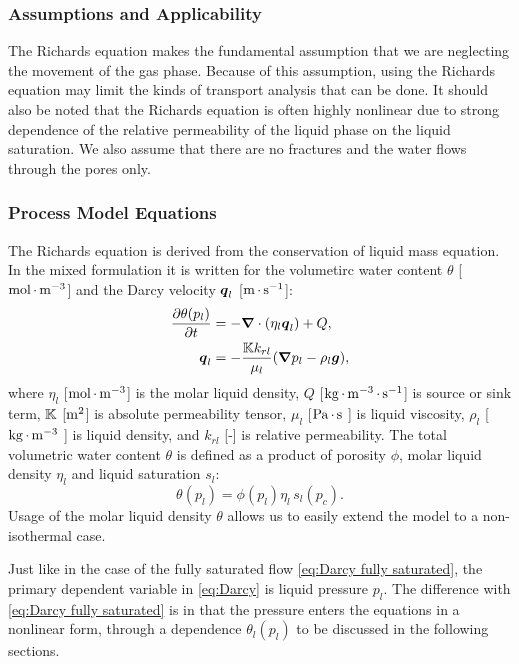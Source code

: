 \subsubsection{Assumptions and Applicability}

The Richards equation makes the fundamental assumption that 
we are neglecting the movement of the gas phase.
Because of this assumption, using the Richards equation may limit the kinds of 
transport analysis that can be done.
It should also be noted that the Richards equation is often highly nonlinear
due to strong dependence of the relative permeability of the liquid phase
on the liquid saturation.
We also assume that there are no fractures and the water flows through the pores only. 


\subsubsection{Process Model Equations} 
\label{sec:richards-model-equations}

The Richards equation is derived from the conservation of
liquid mass equation.
In the mixed formulation it is written
for the volumetirc water content $\theta$ [${\rm mol}{\,\cdot\,}{\rm m}^{-3}$] 
and the Darcy velocity ${\boldsymbol{q}}_l$ [${\rm m}{\,\cdot\,}{\rm s}^{-1}$]:  
\begin{subequations}\label{eq:Darcy}
\begin{align}
  \frac{\partial \theta(p_l)}{\partial t} 
  &= 
  -{\boldsymbol{\nabla}} \cdot (\eta_l {\boldsymbol{q}}_l) + Q,
  \\
  {\boldsymbol{q}}_l 
  &= 
  -\frac{{\mathbb K} k_{rl}}{\mu_l} ({\boldsymbol{\nabla}} p_l - \rho_l {\boldsymbol{g}}),
\end{align}
\end{subequations}
where 
$\eta_l$ [${\rm mol}{\,\cdot\,}{\rm m}^{-3}$] is the molar liquid density,
$Q$ [${\rm kg} {\,\cdot\,} {\rm m}^{-3} {\,\cdot\,} {\rm s}^{-1}$] is source or sink term,
${\mathbb K}$ [${\rm m}^2$] is absolute permeability tensor,
$\mu_l$ [${\rm Pa}{\,\cdot\,}{\rm s}$ ] is liquid viscosity,
$\rho_l$ [${\rm kg}{\,\cdot\,}{\rm m}^{-3}$ ] is liquid density, and
$k_{rl}$ [-] is relative permeability.
The total volumetric water content $\theta$ is defined as
a product of porosity $\phi$, molar liquid density $\eta_l$ and liquid saturation $s_l$:
$$
  \theta(p_l) = \phi(p_l) \eta_l\, s_l(p_c).
$$
Usage of the molar liquid density $\theta$
allows us to easily extend the model to a non-isothermal case.

Just like in the case of the fully saturated flow \eqref{eq:Darcy fully saturated},
the primary dependent variable in \eqref{eq:Darcy} is liquid pressure $p_l$.
The difference with \eqref{eq:Darcy fully saturated}
is in that the pressure enters the equations in a nonlinear form,
through a dependence $\theta_l(p_l)$ to be discussed in the following sections.

